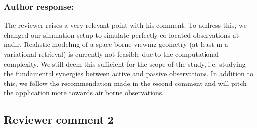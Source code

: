 \documentclass[11pt]{scrartcl}
\begin{document}
\subsubsection*{Author response:}

The reviewer raises a very relevant point with his comment. To address this, we
changed our simulation setup to simulate perfectly co-located observations at
nadir. Realistic modeling of a space-borne viewing geometry (at least in a
variational retrieval) is currently not feasible due to the computational
complexity. We still deem this sufficient for the scope of the study, i.e.
studying the fundamental synergies between active and passive observations. In
addition to this, we follow the recommendation made in the second comment and
will pitch the application more towards air borne observations.

%

\subsection*{Reviewer comment 2}
\end{document}
